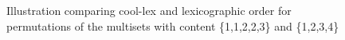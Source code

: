 \begin{figure}
	\caption{Illustration comparing cool-lex and lexicographic order for permutations of the multisets with content \{1,1,2,2,3\} and \{1,2,3,4\}}
	\label{fig:permutations}
\end{figure}


